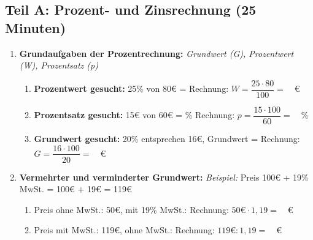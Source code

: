 \subsection*{Teil A: Prozent- und Zinsrechnung (25 Minuten)}

\begin{enumerate}[label=\arabic*.]

    \item \textbf{Grundaufgaben der Prozentrechnung:}
    \textit{Grundwert (G), Prozentwert (W), Prozentsatz (p)}
    \vspace{0.5cm}

    \begin{enumerate}[label=\alph*)]
        \item \textbf{Prozentwert gesucht:} 25\% von 80€ = \underline{\hspace{3cm}}
        Rechnung: $W = \dfrac{25 \cdot 80}{100} = \phantom{00}$€
        \vspace{0.5cm}

        \item \textbf{Prozentsatz gesucht:} 15€ von 60€ = \underline{\hspace{3cm}}\%
        Rechnung: $p = \dfrac{15 \cdot 100}{60} = \phantom{00}$\%
        \vspace{0.5cm}

        \item \textbf{Grundwert gesucht:} 20\% entsprechen 16€, Grundwert = \underline{\hspace{3cm}}
        Rechnung: $G = \dfrac{16 \cdot 100}{20} = \phantom{00}$€
    \end{enumerate}

    \vspace{1cm}

    \item \textbf{Vermehrter und verminderter Grundwert:}
    \textit{Beispiel:} Preis 100€ + 19\% MwSt. = 100€ + 19€ = 119€
    \vspace{0.5cm}

    \begin{enumerate}[label=\alph*)]
        \item Preis ohne MwSt.: 50€, mit 19\% MwSt.: \underline{\hspace{3cm}}
        Rechnung: $50€ \cdot 1,19 = \phantom{00}$€
        \vspace{0.5cm}

        \item Preis mit MwSt.: 119€, ohne MwSt.: \underline{\hspace{3cm}}
        Rechnung: $119€ : 1,19 = \phantom{00}$€
        \vspace{0.5cm}


\end{enumerate}
\end{enumerate}
